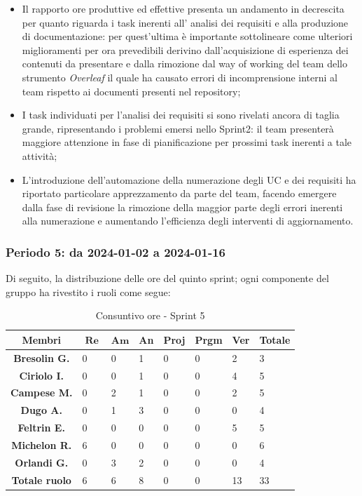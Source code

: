 \documentclass[10pt, a4paper]{article}
\begin{document}
{{{{{{{{{{{{{{{\begin{itemize}
\item Il rapporto ore produttive ed effettive presenta un andamento in decrescita per quanto riguarda i task inerenti all' analisi dei requisiti e alla produzione di documentazione: per 
quest'ultima è importante sottolineare come ulteriori miglioramenti per ora prevedibili derivino dall'acquisizione di esperienza dei contenuti da presentare e dalla rimozione dal way of working del team
dello strumento \textit{Overleaf} il quale ha causato errori di incomprensione interni al team rispetto ai documenti presenti nel repository;
\item I task individuati per l'analisi dei requisiti si sono rivelati ancora di taglia grande, ripresentando i problemi emersi nello Sprint2: il team presenterà maggiore attenzione
in fase di pianificazione per prossimi task inerenti a tale attività;
\item L'introduzione dell'automazione della numerazione degli UC e dei requisiti ha riportato particolare apprezzamento da parte del team, facendo emergere dalla fase di revisione
la rimozione della maggior parte degli errori inerenti alla numerazione e aumentando l'efficienza degli interventi di aggiornamento. 
\end{itemize}
 

\subsubsection{Periodo 5: da 2024-01-02 a 2024-01-16}
Di seguito, la distribuzione delle ore del quinto sprint; ogni componente del gruppo ha rivestito i ruoli come segue:
\begin{table}[H]
    \begin{tabularx}{\textwidth}{c|X|X|X|X|X|X|X}
        \textbf{Membri} & $\operatorname{\textbf{Re}}$ & $\mathrm{\textbf{Am}}$ & \textbf{An} & \textbf{Proj} & \textbf{Prgm} & \textbf{Ver} & \textbf{Totale} \\
        \hline
        \textbf{Bresolin G.} & 0 & 0 & 1 & 0 & 0 & 2 & 3 \\
        \hline
        \textbf{Ciriolo I.}  & 0 & 0 & 1 & 0 & 0 & 4 & 5 \\
        \hline
        \textbf{Campese M.}  & 0 & 2 & 1 & 0 & 0 & 2 & 5 \\
        \hline
        \textbf{Dugo A.}     & 0 & 1 & 3 & 0 & 0 & 0 & 4 \\
        \hline
        \textbf{Feltrin E.}  & 0 & 0 & 0 & 0 & 0 & 5 & 5 \\
        \hline
        \textbf{Michelon R.} & 6 & 0 & 0 & 0 & 0 & 0 & 6 \\
        \hline
        \textbf{Orlandi G.}  & 0 & 3 & 2 & 0 & 0 & 0 & 4 \\
        \hline
        \textbf{Totale ruolo} & 6 & 6 & 8 & 0 & 0 & 13 & 33 \\
    \end{tabularx}
    \caption{Consuntivo ore - Sprint 5}
\end{table}

}}}}}}}}}}}}}}}
\end{document}
